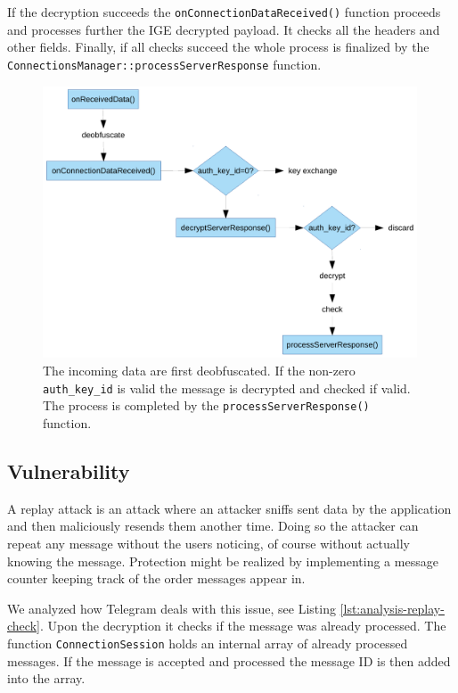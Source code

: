 \documentclass[thesis=M,english]{FITthesis}[2012/10/20]
\begin{document}
If the decryption succeeds the \texttt{onConnectionDataReceived()} function proceeds and processes further the IGE decrypted payload. It checks all the headers and other fields. Finally, if all checks succeed the whole process is finalized by the \texttt{ConnectionsManager::processServerResponse} function.

\begin{figure}[htb]
	\centering
	\includegraphics[width=0.99\textwidth]{incoming-flow.pdf}
	\caption[Incoming data processing]{The incoming data are first deobfuscated. If the non-zero \texttt{auth\_key\_id} is valid the message is decrypted and checked if valid. The process is completed by the \texttt{processServerResponse()} function.}
	\label{img:analysis-replay-incoming}
\end{figure}


\subsection{Vulnerability}

A replay attack is an attack where an attacker sniffs sent data by the application and then maliciously resends them another time. Doing so the attacker can repeat any message without the users noticing, of course without actually knowing the message. Protection might be realized by implementing a message counter keeping track of the order messages appear in.

We analyzed how Telegram deals with this issue, see Listing \ref{lst:analysis-replay-check}. Upon the decryption it checks if the message was already processed. The function \texttt{ConnectionSession} holds an internal array of already processed messages. If the message is accepted and processed the message ID is then added into the array.
\end{document}
